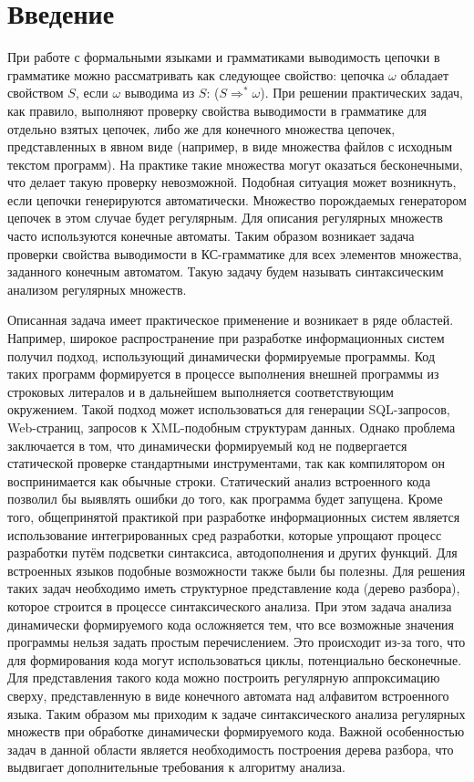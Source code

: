 \section*{Введение}
При работе с формальными языками и грамматиками выводимость цепочки в грамматике можно рассматривать как следующее свойство: цепочка $\omega$ обладает свойством $S$, если $\omega$ выводима из $S$: ($S \Rightarrow^* \omega $). При решении практических задач, как правило, выполняют проверку свойства выводимости в грамматике для отдельно взятых цепочек, либо же для конечного множества цепочек, представленных в явном виде (например, в виде множества файлов с исходным текстом программ). На практике такие множества могут оказаться бесконечными, что делает такую проверку невозможной. Подобная ситуация может возникнуть, если цепочки генерируются автоматически. Множество порождаемых генератором цепочек в этом случае будет регулярным. Для описания регулярных множеств часто используются конечные автоматы. Таким образом возникает задача проверки свойства выводимости в КС-грамматике для всех элементов множества, заданного конечным автоматом. Такую задачу будем называть синтаксическим анализом регулярных множеств. 
	
Описанная задача имеет практическое применение и возникает в ряде областей. Например, широкое распространение при разработке информационных систем получил подход, использующий динамически формируемые программы. Код таких программ формируется в процессе выполнения внешней программы из строковых литералов и в дальнейшем выполняется соответствующим окружением. Такой подход может использоваться для генерации SQL-запросов, Web-страниц, запросов к XML-подобным структурам данных. Однако проблема заключается в том, что динамически формируемый код не подвергается статической проверке стандартными инструментами, так как компилятором он воспринимается как обычные строки. Статический анализ встроенного кода позволил бы выявлять ошибки до того, как программа будет запущена. Кроме того, общепринятой практикой при разработке информационных систем является использование интегрированных сред разработки, которые упрощают процесс разработки путём подсветки синтаксиса, автодополнения и других функций. Для встроенных языков подобные возможности также были бы полезны. Для решения таких задач необходимо иметь структурное представление кода (дерево разбора), которое строится в процессе синтаксического анализа. При этом задача анализа динамически формируемого кода осложняется тем, что все возможные значения программы нельзя задать простым перечислением. Это происходит из-за того, что для формирования кода могут использоваться циклы, потенциально бесконечные. Для представления такого кода можно построить регулярную аппроксимацию сверху, представленную в виде конечного автомата над алфавитом встроенного языка. Таким образом мы приходим к задаче синтаксического анализа регулярных множеств при обработке динамически формируемого кода. Важной особенностью задач в данной области является необходимость построения дерева разбора, что выдвигает дополнительные требования к алгоритму анализа.

